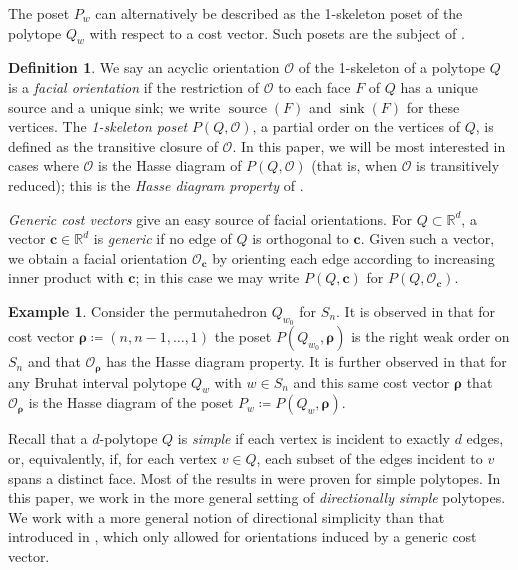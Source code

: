 \documentclass[12pt]{amsart}
\theoremstyle{plain}
\theoremstyle{definition}
\newtheorem{defn}[thm]{Definition}
\newtheorem{ex}[thm]{Example}
\theoremstyle{remark}
\DeclareMathOperator{\sink}{sink}
\DeclareMathOperator{\srce}{source}
\def\reals{{\mathbb R}}
\begin{document}
The poset $P_w$ can alternatively be described as the 1-skeleton poset of the polytope $Q_w$ with respect to a cost vector. Such posets are the subject of \cite{He}.  


\begin{defn}
\label{def:facial-orientation}
We say an acyclic orientation $\mathcal{O}$ of the 1-skeleton of a polytope $Q$ is a \emph{facial orientation} if the restriction of $\mathcal{O}$ to each face $F$ of $Q$ has a unique source and a unique sink; we write $\srce(F)$ and $\sink(F)$ for these vertices. The \emph{1-skeleton poset} $P(Q,\mathcal{O})$, a partial order on the vertices of $Q$, is defined as the transitive closure of $\mathcal{O}$. In this paper, we will be most interested in cases where $\mathcal{O}$ is the Hasse diagram of $P(Q,\mathcal{O})$ (that is, when $\mathcal{O}$ is transitively reduced); this is the \emph{Hasse diagram property} of \cite{He}.
\end{defn}

\emph{Generic cost vectors} give an easy source of facial orientations. For $Q \subset \reals^d$, a vector $\mathbf{c}\in \reals^d$ is \emph{generic} if no edge of $Q$ is orthogonal to $\mathbf{c}$. Given such a vector, we obtain a facial orientation $\mathcal{O}_{\mathbf{c}}$ by orienting each edge according to increasing inner product with $\mathbf{c}$; in this case we may write $P(Q,\mathbf{c})$ for $P(Q,\mathcal{O}_{\mathbf{c}})$.


\begin{ex}
Consider the permutahedron $Q_{w_0}$ for $S_n$. It is observed in 
\cite{He} that for cost vector ${\boldsymbol \rho} \coloneqq (n,n-1,\dots ,1)$ the poset $P(Q_{w_0},\boldsymbol{\rho})$ is the right weak order on $S_n$ and that $\mathcal{O}_{\boldsymbol{\rho}}$ has the Hasse diagram property. It is further observed in \cite{Ga} that for any Bruhat interval polytope $Q_w$ with $w \in S_n$ and this same cost vector ${\boldsymbol \rho}$ that $\mathcal{O}_{\boldsymbol{\rho}}$ is the Hasse diagram of the poset $P_w \coloneqq P(Q_w,\boldsymbol{\rho})$.
\end{ex}


Recall that a $d$-polytope $Q$ is {\it simple} if each vertex is incident to exactly $d$ edges, or, equivalently, if, for each vertex $v\in Q$, each subset of the edges incident to $v$ spans a distinct face. Most of the results in \cite{He} were proven for simple polytopes. In this paper, we work in the more general setting of \emph{directionally simple} polytopes. We work with a more general notion of directional simplicity than that introduced in \cite{Ga}, which only allowed for orientations induced by a generic cost vector.
\end{document}
